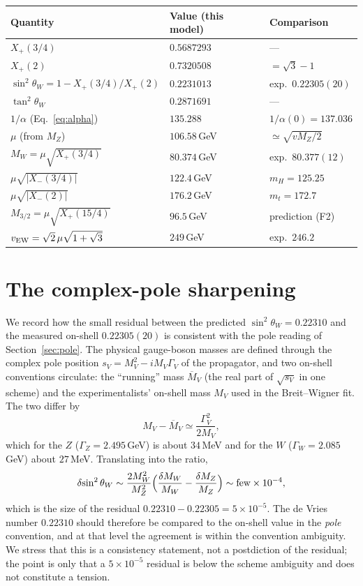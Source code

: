 \documentclass[11pt]{article}
\theoremstyle{plain}
\theoremstyle{definition}
\newcommand{\Xp}{X_{+}}
\newcommand{\Xm}{X_{-}}
\newcommand{\sinsq}{\sin^{2}\theta_W}
\begin{document}
\begin{longtable}{p{}p{}p{}}
\toprule
Quantity & Value (this model) & Comparison\\
\midrule\endhead
$\Xp(3/4)$ & $0.5687293$ & ---\\
$\Xp(2)$ & $0.7320508$ & $=\sqrt3-1$\\
$\sinsq=1-\Xp(3/4)/\Xp(2)$ & $0.2231013$ & exp.\ $0.22305(20)$\\
$\tan^2\theta_W$ & $0.2871691$ & ---\\
$1/\alpha$ (Eq.~\eqref{eq:alpha}) & $135.288$ & $1/\alpha(0)=137.036$\\
$\mu$ (from $M_Z$) & $106.58\,$GeV & $\simeq\sqrt{vM_Z/2}$\\
$M_W=\mu\sqrt{\Xp(3/4)}$ & $80.374\,$GeV & exp.\ $80.377(12)$\\
$\mu\sqrt{|\Xm(3/4)|}$ & $122.4\,$GeV & $m_H=125.25$\\
$\mu\sqrt{|\Xm(2)|}$ & $176.2\,$GeV & $m_t=172.7$\\
$M_{3/2}=\mu\sqrt{\Xp(15/4)}$ & $96.5\,$GeV & prediction (F2)\\
$v_{\rm EW}=\sqrt2\,\mu\sqrt{1+\sqrt3}$ & $249\,$GeV & exp.\ $246.2$\\
\bottomrule
\end{longtable}

\section{The complex-pole sharpening}
\label{app:pole}

We record how the small residual between the predicted $\sinsq=0.22310$ and
the measured on-shell $0.22305(20)$ is consistent with the pole reading of
Section~\ref{sec:pole}. The physical gauge-boson masses are defined through
the complex pole position $s_V=M_V^2-iM_V\Gamma_V$ of the propagator, and
two on-shell conventions circulate: the ``running'' mass $\overline M_V$
(the real part of $\sqrt{s_V}$ in one scheme) and the experimentalists'
on-shell mass $M_V$ used in the Breit--Wigner fit. The two differ by
\begin{equation}
M_V-\overline M_V\simeq\frac{\Gamma_V^2}{2M_V},
\end{equation}
which for the $Z$ ($\Gamma_Z=2.495\,$GeV) is about $34\,$MeV and for the
$W$ ($\Gamma_W=2.085\,$GeV) about $27\,$MeV. Translating into the ratio,
\begin{equation}
\delta\!\sinsq\sim\frac{2M_W^2}{M_Z^2}\Bigl(\frac{\delta M_W}{M_W}
-\frac{\delta M_Z}{M_Z}\Bigr)\sim\text{few}\times10^{-4},
\end{equation}
which is the size of the residual $0.22310-0.22305=5\times10^{-5}$. The de
Vries number $0.22310$ should therefore be compared to the on-shell value in
the \emph{pole} convention, and at that level the agreement is within the
convention ambiguity. We stress that this is a consistency statement, not a
postdiction of the residual; the point is only that a $5\times10^{-5}$
residual is below the scheme ambiguity and does not constitute a tension.
\end{document}
